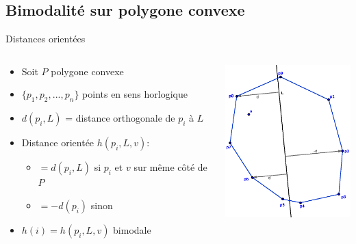 \documentclass{beamer}
\begin{document}
\subsection{Bimodalité sur polygone convexe}

\begin{frame}{Distances orientées}
	\begin{columns}[c]
	\begin{column}[T]{.5\textwidth}
		\begin{itemize}
		\item Soit $P$ polygone convexe
		\item $\{ p_{1}, p_{2}, ..., p_{n} \}$ points en sens horlogique
		\item $d(p_{i}, L)$ = distance orthogonale de $p_{i}$ à $L$
		\item Distance orientée $h(p_{i}, L, v)$:
			\begin{itemize}
			\item $= d(p_{i}, L)$ si $p_{i}$ et $v$ sur même côté de $P$
			\item $= -d(p_{i})$ sinon
			\end{itemize}
		\item $h(i) = h(p_{i}, L, v)$ bimodale
		\end{itemize}
	\end{column}
	\begin{column}[T]{.5\textwidth}
		\includegraphics[width=5cm]{h.eps}
	\end{column}
	\end{columns}
\end{frame}
\end{document}
